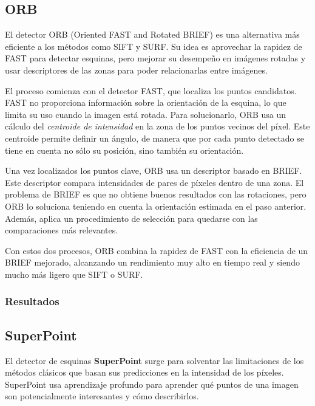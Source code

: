 
\subsection{ORB}

El detector ORB (Oriented FAST and Rotated BRIEF) \cite{rublee2011orb} es una alternativa más eficiente a los métodos como SIFT y SURF. Su idea es aprovechar la rapidez de FAST para detectar esquinas, pero mejorar su desempeño en imágenes rotadas y usar descriptores de las zonas para poder relacionarlas entre imágenes.

El proceso comienza con el detector FAST, que localiza los puntos candidatos. FAST no proporciona información sobre la orientación de la esquina, lo que limita su uso cuando la imagen está rotada. Para solucionarlo, ORB usa un cálculo del \emph{centroide de intensidad} en la zona de los puntos vecinos del píxel. Este centroide permite definir un ángulo, de manera que por cada punto detectado se tiene en cuenta no sólo su posición, sino también su orientación.

Una vez localizados los puntos clave, ORB usa un descriptor basado en BRIEF. Este descriptor compara intensidades de pares de píxeles dentro de una zona. El problema de BRIEF es que no obtiene buenos resultados con las rotaciones, pero ORB lo soluciona teniendo en cuenta la orientación estimada en el paso anterior. Además, aplica un procedimiento de selección para quedarse con las comparaciones más relevantes. 

Con estos dos procesos, ORB combina la rapidez de FAST con la eficiencia de un BRIEF mejorado, alcanzando un rendimiento muy alto en tiempo real y siendo mucho más ligero que SIFT o SURF.


\subsubsection{Resultados}


\subsection{SuperPoint}

El detector de esquinas \textbf{SuperPoint} \cite{detone2018superpoint} surge para solventar las limitaciones de los métodos clásicos que basan sus predicciones en la intensidad de los píxeles. SuperPoint usa aprendizaje profundo para aprender qué puntos de una imagen son potencialmente interesantes y cómo describirlos.

